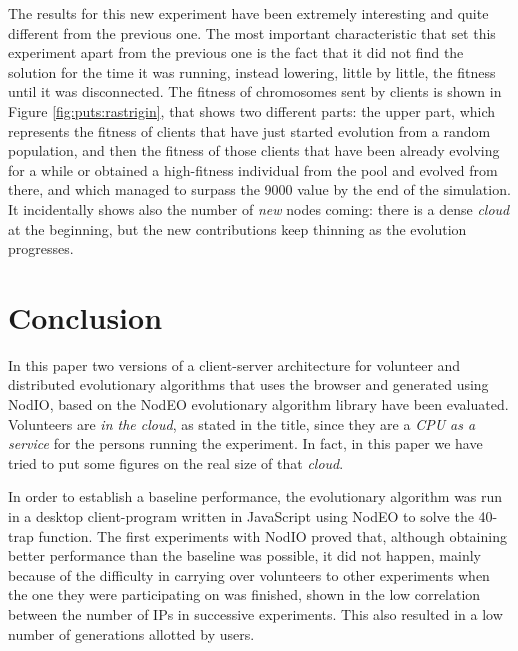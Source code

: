 \documentclass[journal,onecolumn]{IEEEtran}
\begin{document}
The results for this new experiment have been extremely interesting
and quite different from the previous one. The most important
characteristic that set this experiment apart from the previous one is
the fact that it did not find the solution for the time it was
running, instead lowering, little by little, the fitness until it was
disconnected. The fitness of chromosomes sent by clients is shown in
Figure \ref{fig:puts:rastrigin}, that shows two different parts: the
upper part, which represents the fitness of clients that have just
started evolution from a random population, and then the fitness of
those clients that have been already evolving for a while or obtained
a high-fitness individual from the pool and evolved from there, and
which managed to surpass the 9000 value by the end of the
simulation. It incidentally shows also the number of {\em new} nodes
coming: there is a dense {\em cloud} at the beginning, but the new
contributions keep thinning as the evolution progresses. 



\section{Conclusion}
\label{sec:conclusion}

In this paper two versions of a client-server architecture for volunteer and distributed
evolutionary algorithms that uses the browser and generated using {\sf
  NodIO}, based on the {\sf NodEO} evolutionary algorithm library have been
evaluated. Volunteers are {\em in the cloud}, as stated in the title,
since they are a {\em CPU as a service} for the persons running the
experiment. In fact, in this paper we have tried to put some figures
on the real size of that {\em cloud}.

In order to establish a baseline performance, the evolutionary
algorithm was run in a desktop client-program written in JavaScript
using NodEO to solve the 40-trap function. The first experiments with
{\sf NodIO} proved that, although obtaining better performance than the
baseline was possible, it did not happen, mainly because of the
difficulty in carrying over volunteers to other experiments when the
one they were participating on was finished, shown in the low
correlation between the number of IPs in successive experiments. This
also resulted in a low number of generations allotted by users. 
\end{document}
